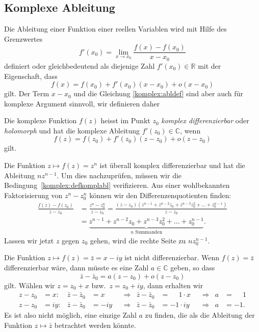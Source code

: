 %
%
\subsection{Komplexe Ableitung}
Die Ableitung einer Funktion einer reellen Variablen wird mit Hilfe des
Grenzwertes
\[
f'(x_0)=\lim_{x\to x_0}\frac{f(x)-f(x_0)}{x-x_0}
\]
definiert oder gleichbedeutend als diejenige Zahl $f'(x_0)\in\mathbb R$
mit der Eigenschaft, dass
\begin{equation}
f(x)=f(x_0)+f'(x_0)(x-x_0) + o(x-x_0)
\label{komplex:abldef}
\end{equation}
gilt.
Der Term $x-x_0$ und die Gleichung \eqref{komplex:abldef} sind aber auch
für komplexe Argument sinnvoll, wir definieren daher

\begin{definition}
\label{buch:funktionentheorie:definition:differenzierbar}
Die komplexe Funktion $f(z)$ heisst im Punkt $z_0$
{\em komplex differenzierbar} oder {\em holomorph}
und hat die komplexe Ableitung $f'(z_0)\in\mathbb C$, wenn
%
%
%
%
\begin{equation}
f(z)=f(z_0) + f'(z_0)(z-z_0) +o(z-z_0)
\label{komplex:defkomplabl}
\end{equation}
gilt.
\end{definition}

\begin{beispiel}
Die Funktion $z\mapsto f(z)=z^n$ ist überall komplex differenzierbar
und hat die Ableitung $nz^{n-1}$.
Um dies nachzuprüfen, müssen wir die Bedingung~\eqref{komplex:defkomplabl}
verifizieren.
Aus einer wohlbekannten Faktorisierung von $z^n - z_0^n$ können wir den
Differenzenquotienten finden:
\begin{align*}
\frac{f(z)-f(z_0)}{z-z_0}
&=
\frac{z^n-z_0^n}{z-z_0}
=
\frac{(z-z_0)(z^{n-1}+z^{n-2}z_0+z^{n-3}z_0^2+\dots+z_0^{n-1})}{z-z_0}
\\
&=
\underbrace{z^{n-1}+z^{n-2}z_0+z^{n-3}z_0^2+\dots+z_0^{n-1}
}_{\displaystyle \text{$n$ Summanden}}.
\end{align*}
Lassen wir jetzt $z$ gegen $z_0$ gehen, wird die rechte Seite
zu $nz_0^{n-1}$.
\end{beispiel}

\begin{beispiel}
Die Funktion $z\mapsto f(z)=\bar z=x-iy$ ist nicht differenzierbar.
Wenn $f(z)=\bar z$ differenzierbar wäre, dann müsste es eine Zahl
$a\in\mathbb C$ geben, so dass
\[
\bar z-\bar z_0=a(z-z_0)+o(z-z_0)
\]
gilt.
Wählen wir $z=z_0+x$ bzw.~$z=z_0+iy$, dann erhalten wir
\[
\begin{aligned}
z-z_0&=x:&
\bar z-\bar z_0&=x
&&\Rightarrow&
\bar z-\bar z_0&=\phantom{-}1\cdot x
&&\Rightarrow&
a&=\phantom{-}1
\\
z-z_0&=iy:&
\bar z-\bar z_0&=-iy
&&\Rightarrow&
\bar z-\bar z_0&=-1\cdot iy
&&\Rightarrow&
a&=-1.
\end{aligned}
\]
Es ist also nicht möglich, eine einzige Zahl $a$ zu finden, die als
die Ableitung der Funktion $z\mapsto \bar z$ betrachtet werden könnte.
\end{beispiel}

